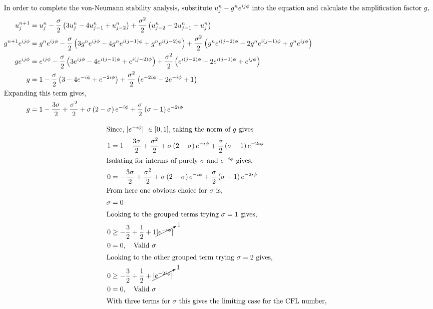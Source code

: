 \begin{enumerate}[label=\alph*., start = 1]
    \vspace{-0.35in}
    \begin{align*}
        \shortintertext{In order to complete the von-Neumann stability analysis, substitute $u_j^n - g^ne^{ij\phi}$ into the equation and calculate the amplification factor $g$,}
        u_j^{n+1} & = u_j^n - \frac{\sigma}{2}\left(3u_j^n - 4u_{j-1}^n + u_{j-2}^n\right) + \frac{\sigma^2}{2}\left(u_{j-2}^n - 2u_{j-1}^n + u_j^n\right)\\
        g^{n+1}e^{ij\phi} & = g^{n}e^{ij\phi} - \frac{\sigma}{2}\left(3g^{n}e^{ij\phi} - 4g^{n}e^{i(j-1)\phi} + g^{n}e^{i(j-2)\phi}\right) + \frac{\sigma^2}{2}\left(g^{n}e^{i(j-2)\phi} - 2g^{n}e^{i(j-1)\phi} + g^{n}e^{ij\phi}\right)\\
        ge^{ij\phi} & = e^{ij\phi} - \frac{\sigma}{2}\left(3e^{ij\phi} - 4e^{i(j-1)\phi} + e^{i(j-2)\phi}\right) + \frac{\sigma^2}{2}\left(e^{i(j-2)\phi} - 2e^{i(j-1)\phi} + e^{ij\phi}\right)\\
        g & = 1 - \frac{\sigma}{2}\left(3 - 4e^{-i\phi} + e^{-2i\phi}\right) + \frac{\sigma^2}{2}\left(e^{-2i\phi} - 2e^{-i\phi} + 1\right)\\
        \shortintertext{Expanding this term gives,}
        g & = 1 - \frac{3\sigma}{2} + \frac{\sigma^2}{2} + \sigma\left(2 - \sigma\right)e^{-i\phi} + \frac{\sigma}{2}\left(\sigma - 1\right)e^{-2i\phi}\\
    \end{align*}

    \vspace{-0.75in}
    \begin{align*}
        \shortintertext{Since, $|e^{-i\phi}|\ \in [0,1]$, taking the norm of $g$ gives}
        1 & = 1 - \frac{3\sigma}{2} + \frac{\sigma^2}{2} + \sigma\left(2 - \sigma\right)e^{-i\phi} + \frac{\sigma}{2}\left(\sigma - 1\right)e^{-2i\phi}\\
        \shortintertext{Isolating for interms of purely $\sigma$ and $e^{-i\phi}$ gives,}
        0 & = - \frac{3\sigma}{2} + \frac{\sigma^2}{2} + \sigma\left(2 - \sigma\right)e^{-i\phi} + \frac{\sigma}{2}\left(\sigma - 1\right)e^{-2i\phi}\\
        \shortintertext{From here one obvious choice for $\sigma$ is,}
        \sigma & = 0\\
        \shortintertext{Looking to the grouped terms trying $\sigma = 1$ gives,}
        0 & \ge -\frac{3}{2} + \frac{1}{2} + 1\cancelto{1}{|e^{-i\phi}|}\\
        0 & = 0,\quad \text{Valid}\ \sigma\\
        \shortintertext{Looking to the other grouped term trying $\sigma = 2$ gives,}
        0 & \ge -\frac{3}{2} + \frac{1}{2}+ \cancelto{1}{|e^{-2i\phi}|}\\
        0 & = 0,\quad \text{Valid}\ \sigma\\
        \shortintertext{With three terms for $\sigma$ this gives the limiting case for the CFL number,}
    \end{align*}


\end{enumerate}
